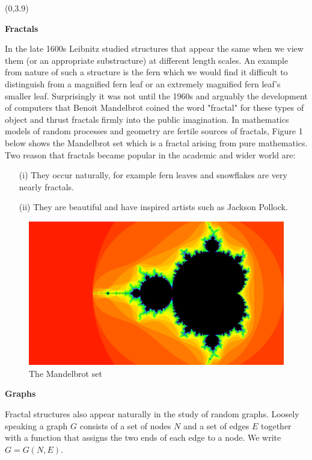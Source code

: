 \documentclass[a1,portrait]{a0poster}
\def\Head#1{{\noindent\raggedright{\large\textsf{\textbf{#1}}}\par}}
\begin{document}
\begin{textblock}{8}(0,3.9)

\Head{Fractals} 
In the late 1600s Leibnitz studied structures that appear the same when we view them (or an appropriate substructure) at different length scales.  An example from nature of such a structure is the fern which we would find it difficult to distinguish from a magnified fern leaf or an extremely magnified fern leaf's smaller leaf. Surprisingly it was not until the 1960s and arguably the development of computers that Benoit Mandelbrot coined the word "fractal" for these types of object and thrust fractals firmly into the public imagination.  In mathematics models of random processes and geometry are fertile sources of fractals, Figure 1 below shows the Mandelbrot set which is a fractal arising from pure mathematics. Two reason that fractals became popular in the academic and wider world are:
\begin{itemize}
\item[(i)] They occur naturally, for example fern leaves and snowflakes are very nearly fractals.  
\item[(ii)] They are beautiful and have inspired artists such as Jackson Pollock.
\end{itemize}

\begin{figure}
\centering
\includegraphics[scale=0.75]{frac.png}
\caption{The Mandelbrot set}
\label{fig:joetwat}
\end{figure}



\Head{Graphs}
Fractal structures also appear naturally in the study of random graphs.  Loosely speaking a graph $G$ consists of a set of nodes $N$ and a set of edges $E$ together with a function that assigns the two ends of each edge to a node.  We write $G = G(N,E)$.


\end{textblock}
\end{document}
